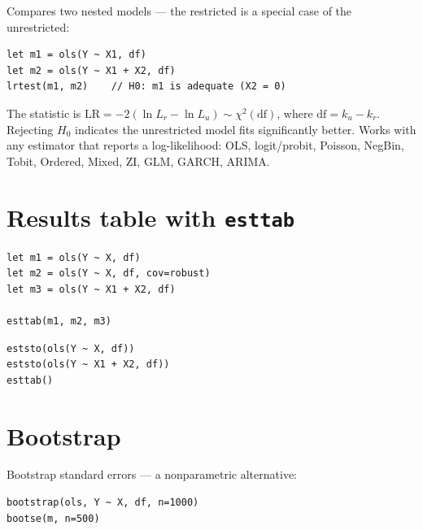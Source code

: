Compares two nested models --- the restricted is a special case of the
unrestricted:

\begin{lstlisting}
let m1 = ols(Y ~ X1, df)
let m2 = ols(Y ~ X1 + X2, df)
lrtest(m1, m2)    // H0: m1 is adequate (X2 = 0)
\end{lstlisting}

The statistic is $\mathrm{LR} = -2(\ln L_r - \ln L_u) \sim \chi^2(\mathrm{df})$,
where $\mathrm{df} = k_u - k_r$. Rejecting $H_0$ indicates the unrestricted
model fits significantly better. Works with any estimator that reports a
log-likelihood: OLS, logit/probit, Poisson, NegBin, Tobit, Ordered, Mixed,
ZI, GLM, GARCH, ARIMA.

\section{Results table with \texttt{esttab}}

\begin{lstlisting}[caption={Comparing specifications}]
let m1 = ols(Y ~ X, df)
let m2 = ols(Y ~ X, df, cov=robust)
let m3 = ols(Y ~ X1 + X2, df)

esttab(m1, m2, m3)
\end{lstlisting}

\begin{lstlisting}
eststo(ols(Y ~ X, df))
eststo(ols(Y ~ X1 + X2, df))
esttab()
\end{lstlisting}

\section{Bootstrap}

Bootstrap standard errors --- a nonparametric alternative:

\begin{lstlisting}
bootstrap(ols, Y ~ X, df, n=1000)
bootse(m, n=500)
\end{lstlisting}
